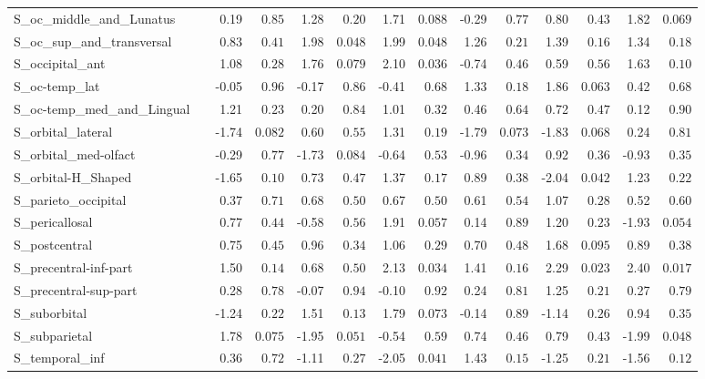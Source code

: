 {\begin{longtable}{llrrrrrrrrrrrr}
S\_oc\_middle\_and\_Lunatus &  & 0.19 & $0.85$ & 1.28 & $0.20$ & 1.71 & $0.088$ & -0.29 & $0.77$ & 0.80 & $0.43$ & 1.82 & $0.069$ \\
S\_oc\_sup\_and\_transversal &  & 0.83 & $0.41$ & 1.98 & $0.048$ & 1.99 & $0.048$ & 1.26 & $0.21$ & 1.39 & $0.16$ & 1.34 & $0.18$ \\
S\_occipital\_ant &  & 1.08 & $0.28$ & 1.76 & $0.079$ & 2.10 & $0.036$ & -0.74 & $0.46$ & 0.59 & $0.56$ & 1.63 & $0.10$ \\
S\_oc-temp\_lat &  & -0.05 & $0.96$ & -0.17 & $0.86$ & -0.41 & $0.68$ & 1.33 & $0.18$ & 1.86 & $0.063$ & 0.42 & $0.68$ \\
S\_oc-temp\_med\_and\_Lingual &  & 1.21 & $0.23$ & 0.20 & $0.84$ & 1.01 & $0.32$ & 0.46 & $0.64$ & 0.72 & $0.47$ & 0.12 & $0.90$ \\
S\_orbital\_lateral &  & -1.74 & $0.082$ & 0.60 & $0.55$ & 1.31 & $0.19$ & -1.79 & $0.073$ & -1.83 & $0.068$ & 0.24 & $0.81$ \\
S\_orbital\_med-olfact &  & -0.29 & $0.77$ & -1.73 & $0.084$ & -0.64 & $0.53$ & -0.96 & $0.34$ & 0.92 & $0.36$ & -0.93 & $0.35$ \\
S\_orbital-H\_Shaped &  & -1.65 & $0.10$ & 0.73 & $0.47$ & 1.37 & $0.17$ & 0.89 & $0.38$ & -2.04 & $0.042$ & 1.23 & $0.22$ \\
S\_parieto\_occipital &  & 0.37 & $0.71$ & 0.68 & $0.50$ & 0.67 & $0.50$ & 0.61 & $0.54$ & 1.07 & $0.28$ & 0.52 & $0.60$ \\
S\_pericallosal &  & 0.77 & $0.44$ & -0.58 & $0.56$ & 1.91 & $0.057$ & 0.14 & $0.89$ & 1.20 & $0.23$ & -1.93 & $0.054$ \\
S\_postcentral &  & 0.75 & $0.45$ & 0.96 & $0.34$ & 1.06 & $0.29$ & 0.70 & $0.48$ & 1.68 & $0.095$ & 0.89 & $0.38$ \\
S\_precentral-inf-part &  & 1.50 & $0.14$ & 0.68 & $0.50$ & 2.13 & $0.034$ & 1.41 & $0.16$ & 2.29 & $0.023$ & 2.40 & $0.017$ \\
S\_precentral-sup-part &  & 0.28 & $0.78$ & -0.07 & $0.94$ & -0.10 & $0.92$ & 0.24 & $0.81$ & 1.25 & $0.21$ & 0.27 & $0.79$ \\
S\_suborbital &  & -1.24 & $0.22$ & 1.51 & $0.13$ & 1.79 & $0.073$ & -0.14 & $0.89$ & -1.14 & $0.26$ & 0.94 & $0.35$ \\
S\_subparietal &  & 1.78 & $0.075$ & -1.95 & $0.051$ & -0.54 & $0.59$ & 0.74 & $0.46$ & 0.79 & $0.43$ & -1.99 & $0.048$ \\
S\_temporal\_inf &  & 0.36 & $0.72$ & -1.11 & $0.27$ & -2.05 & $0.041$ & 1.43 & $0.15$ & -1.25 & $0.21$ & -1.56 & $0.12$ \\

\end{longtable}}
